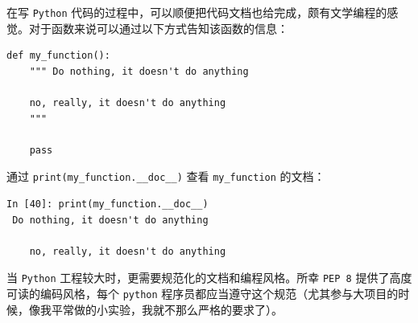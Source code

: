 \documentclass[10pt,a4paper,UTF8]{article}
\begin{document}
在写 \texttt{Python} 代码的过程中，可以顺便把代码文档也给完成，颇有文学编程的感觉。对于函数来说可以通过以下方式告知该函数的信息：
\lstset{language=Python,label= ,caption= ,captionpos=b,firstnumber=1,numbers=left}
\begin{lstlisting}
def my_function():
    """ Do nothing, it doesn't do anything

    no, really, it doesn't do anything
    """

    pass
\end{lstlisting}

通过 \texttt{print(my\_function.\_\_doc\_\_)} 查看 \texttt{my\_function} 的文档：
\begin{verbatim}
In [40]: print(my_function.__doc__)
 Do nothing, it doesn't do anything

    no, really, it doesn't do anything
\end{verbatim}


当 \texttt{Python} 工程较大时，更需要规范化的文档和编程风格。所幸 \texttt{PEP 8} 提供了高度可读的编码风格，每个 \texttt{python} 程序员都应当遵守这个规范（尤其参与大项目的时候，像我平常做的小实验，我就不那么严格的要求了）。
\end{document}

